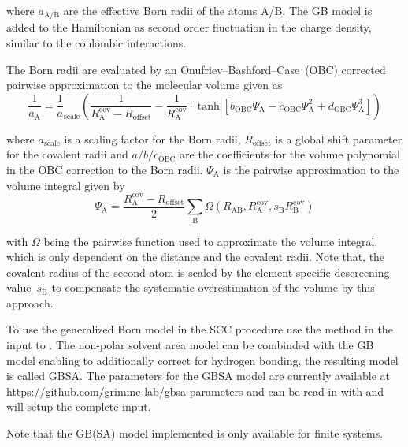 where $a_\text{A/B}$ are the effective Born radii of the atoms A/B.
The GB model is added to the Hamiltonian as second order fluctuation
in the charge density, similar to the coulombic interactions.

The Born radii are evaluated by an Onufriev--Bashford--Case~(OBC) corrected
pairwise approximation to the molecular volume given as
%
\begin{equation}
  \frac1{a_\text{A}} = \frac1a_\text{scale}\left(
  \frac1{R^\text{cov}_\text{A} - R_\text{offset}}
  - \frac1{R^\text{cov}_\text{A}}
  \cdot \tanh\left[b_\text{OBC}\Psi_\text{A}
  - c_\text{OBC}\Psi_\text{A}^2 + d_\text{OBC}\Psi_\text{A}^3\right]
  \right)
\end{equation}

where $a_\text{scale}$ is a scaling factor for the Born radii,
$R_\text{offset}$ is a global shift parameter for the covalent radii and
$a/b/c_\text{OBC}$ are the coefficients for the volume polynomial in
the OBC correction to the Born radii.
$\Psi_\text{A}$ is the pairwise approximation to the volume integral
given by
%
\begin{equation}
  \Psi_\text{A} = \frac{R^\text{cov}_\text{A} - R_\text{offset}}2
  \sum_\text{B} \Omega(R_\text{AB}, R^\text{cov}_\text{A}, s_\text{B}R^\text{cov}_\text{B})
\end{equation}

with $\Omega$ being the pairwise function used to approximate the
volume integral, which is only dependent on the distance and the
covalent radii. Note that, the covalent radius of the second atom
is scaled by the element-specific descreening value~$s_\text{B}$
to compensate the systematic overestimation of the volume by this
approach.

To use the generalized Born model in the SCC procedure use the
 method in the input to .
The non-polar solvent area model can be combinded with the GB model
enabling to additionally correct for hydrogen bonding, the resulting
model is called GBSA.
The parameters for the GBSA model are currently available at
\url{https://github.com/grimme-lab/gbsa-parameters} and can be read in with
 and will setup the complete  input.

Note that the GB(SA) model implemented is only available for finite
systems.

